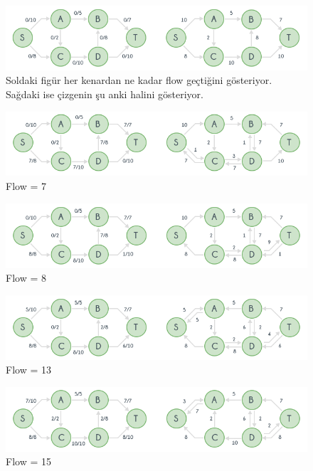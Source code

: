 \documentclass[12pt]{article}
\begin{document}
\begin{figure}[H]
\centering
\includegraphics[width=\linewidth/4*3]{flow1.png}
\caption{Soldaki figür her kenardan ne kadar flow geçtiğini gösteriyor. Sağdaki ise çizgenin şu anki halini gösteriyor.}
\label{fig:prime1}
\end{figure}

\begin{figure}[H]
\centering
\includegraphics[width=\linewidth/4*3]{flow2.png}
\caption{Flow = 7}
\label{fig:prime1}
\end{figure}

\begin{figure}[H]
\centering
\includegraphics[width=\linewidth/4*3]{flow3.png}
\caption{Flow = 8}
\label{fig:prime1}
\end{figure}

\begin{figure}[H]
\centering
\includegraphics[width=\linewidth/4*3]{flow4.png}
\caption{Flow = 13}
\label{fig:prime1}
\end{figure}

\begin{figure}[H]
\centering
\includegraphics[width=\linewidth/4*3]{flow5.png}
\caption{Flow = 15}
\label{fig:prime1}
\end{figure}
    
\end{document}
